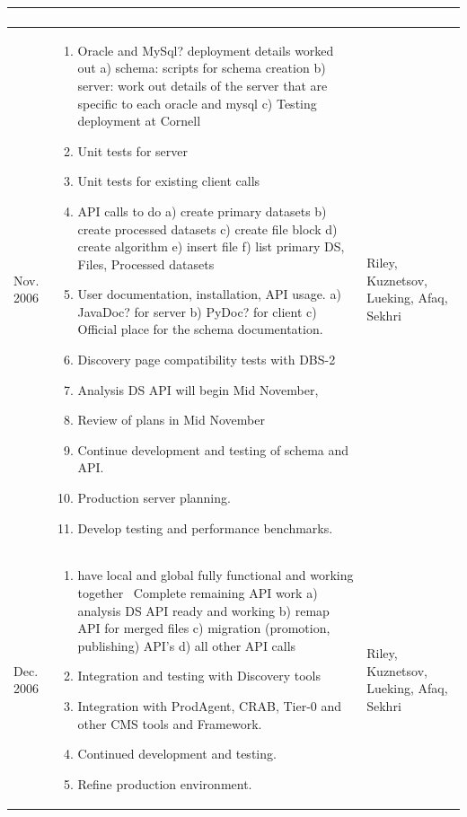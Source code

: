 \documentclass{cmspaper}
\begin{document}
\begin{table}[htb]
\begin{center}
\begin{tabular}{|l|p{3.5in}|p{1.5in}|}
\begin{enumerate}
\end{enumerate}& \\ \hline
Nov. 2006  & 
\begin{enumerate}
  \item  Oracle and MySql? deployment details worked out
         a) schema: scripts for schema creation
         b) server: work out details of the server that are specific to each oracle and mysql
         c) Testing deployment at Cornell 
  \item  Unit tests for server
  \item  Unit tests for existing client calls
  \item  API calls to do
         a) create primary datasets
         b) create processed datasets
         c) create file block
         d) create algorithm
         e) insert file
         f) list primary DS, Files, Processed datasets 
   \item  User documentation, installation, API usage.
         a) JavaDoc? for server
         b) PyDoc? for client
         c) Official place for the schema documentation. 
   \item  Discovery page compatibility tests with DBS-2
   \item  Analysis DS API will begin Mid November,
   \item  Review of plans in Mid November 
 \item Continue development and testing of schema and API.
 \item Production server planning.
 \item  Develop testing and performance benchmarks.
\end{enumerate}  & Riley, Kuznetsov, Lueking, Afaq, Sekhri \\ \hline
Dec. 2006      & 
\begin{enumerate}
  \item have local and global fully functional and working together
  \ Complete remaining API work
   a) analysis DS API ready and working
   b) remap API for merged files
   c) migration (promotion, publishing) API's
   d) all other API calls 
 \item Integration and testing with Discovery tools
 \item Integration with ProdAgent, CRAB, Tier-0 and other CMS tools and Framework. 
 \item Continued development and testing.
 \item Refine production environment.   
\end{enumerate} &  Riley, Kuznetsov, Lueking, Afaq, Sekhri \\ \hline

\end{tabular}
\end{center}
\end{table}
\end{document}

